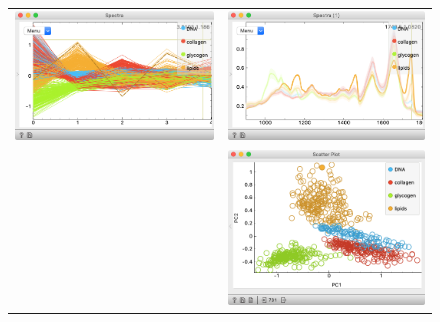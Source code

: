 \begin{figure}[h]
  \centering
  \begin{tabular}{ c  c }
      \includegraphics[scale=0.4]{graphics/ch-spectral_PCA/selection-spectra.png}  & \includegraphics[scale=0.4]{graphics/ch-spectral_PCA/subset-spectra.png} \\
      & \includegraphics[scale=0.4]{graphics/ch-spectral_PCA/subset-scatterplot.png}

\end{tabular}
\end{figure}
